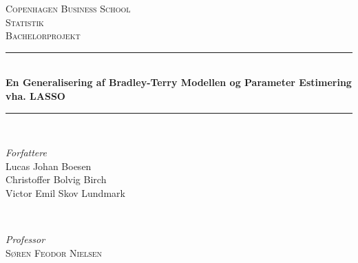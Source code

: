 \documentclass[11pt,a4paper]{article}
\begin{document}
\begin{titlepage} %
	\newcommand{\HRule}{\rule{\linewidth}{0.5mm}} %
	
	\center %
	
	
	\textsc{\LARGE Copenhagen Business School}\\[1.5cm] %
	
	\textsc{\Large Statistik}\\[0.5cm] %
	
	\textsc{\large Bachelorprojekt}\\[0.5cm] %
	
	
	\HRule\\[0.4cm]
	
	{\huge\bfseries En Generalisering af Bradley-Terry Modellen og Parameter Estimering vha. LASSO}\\[0.4cm] %
	
	\HRule\\[1.5cm]
	
	
	\begin{minipage}{0.4\textwidth}
		\begin{flushleft}
			\large
			\textit{Forfattere}\\
			Lucas Johan Boesen\\ %
			Christoffer Bolvig Birch\\ %
			Victor Emil Skov Lundmark\\ %
		\end{flushleft}
	\end{minipage}
	~
	\begin{minipage}{0.4\textwidth}
		\begin{flushright}
			\large
			\textit{Professor}\\
			\textsc{Søren Feodor Nielsen}\\
			\textsc{}\\
			\textsc{}\\%
		\end{flushright}
	\end{minipage}
	

\end{titlepage}
\end{document}
